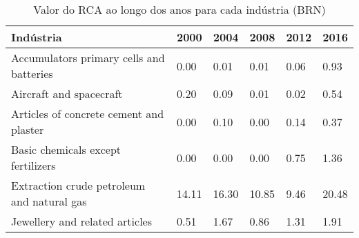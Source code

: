 \begin{table}
\centering
\caption{Valor do RCA ao longo dos anos para cada indústria (BRN)}
\begin{tabular}{p{6cm}p{1.5cm}p{1.5cm}p{1.5cm}p{1.5cm}p{1.5cm}}
\toprule
                                 Indústria &  2000 &  2004 &  2008 & 2012 &  2016 \\
\midrule
  Accumulators primary cells and batteries &  0.00 &  0.01 &  0.01 & 0.06 &  0.93 \\
                   Aircraft and spacecraft &  0.20 &  0.09 &  0.01 & 0.02 &  0.54 \\
   Articles of concrete cement and plaster &  0.00 &  0.10 &  0.00 & 0.14 &  0.37 \\
        Basic chemicals except fertilizers &  0.00 &  0.00 &  0.00 & 0.75 &  1.36 \\
Extraction crude petroleum and natural gas & 14.11 & 16.30 & 10.85 & 9.46 & 20.48 \\
            Jewellery and related articles &  0.51 &  1.67 &  0.86 & 1.31 &  1.91 \\
\bottomrule
\end{tabular}
\end{table}
